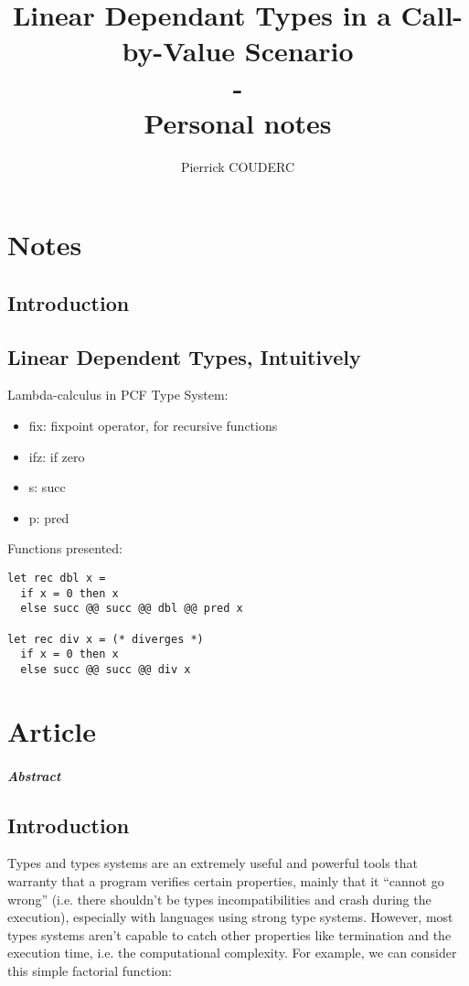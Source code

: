 \documentclass[a4paper,12pt]{report}
\title{Linear Dependant Types in a Call-by-Value Scenario \\
- \\
Personal notes}
\author{Pierrick COUDERC}
\begin{document}
\maketitle

\chapter{Notes}

\section{Introduction}

\section{Linear Dependent Types, Intuitively}

Lambda-calculus in PCF Type System: 
\begin{itemize}
\item fix: fixpoint operator, for recursive functions
\item ifz: if zero
\item s: succ
\item p: pred
\end{itemize}

Functions presented:
\begin{verbatim}
let rec dbl x =
  if x = 0 then x
  else succ @@ succ @@ dbl @@ pred x

let rec div x = (* diverges *)
  if x = 0 then x
  else succ @@ succ @@ div x
\end{verbatim}


\chapter{Article}

\paragraph{Abstract}

\section{Introduction}

Types and types systems are an extremely useful and powerful tools
that warranty that a program verifies certain properties, mainly that
it ``cannot go wrong'' (i.e. there shouldn't be types
incompatibilities and crash during the execution), especially with
languages using strong type systems. However, most types systems
aren't capable to catch other properties like termination and the
execution time, i.e. the computational complexity. For example, we can
consider this simple factorial function:
\end{document}
